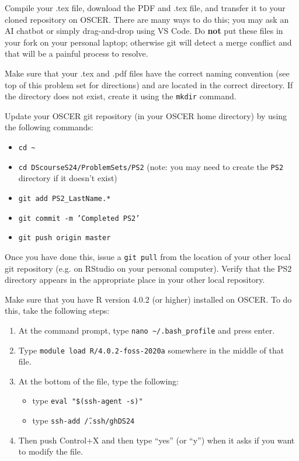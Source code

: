 \documentclass[12pt,english]{exam}
\begin{document}
\begin{questions}
\question Compile your .tex file, download the PDF and .tex file, and transfer it to your cloned repository on OSCER. There are many ways to do this;  you may ask an AI chatbot or simply drag-and-drop using VS Code. Do \textbf{not} put these files in your fork on your personal laptop; otherwise git will detect a merge conflict and that will be a painful process to resolve.

\question Make sure that your .tex and .pdf files have the correct naming convention (see top of this problem set for directions) and are located in the correct directory. If the directory does not exist, create it using the \texttt{mkdir} command.

\question Update your OSCER git repository (in your OSCER home directory) by using the following commands:
\begin{itemize}
    \item \texttt{cd \~}
    \item \texttt{cd DScourseS24/ProblemSets/PS2} (note: you may need to create the \texttt{PS2} directory if it doesn't exist)
    \item \texttt{git add PS2\_LastName.*}
    \item \texttt{git commit -m 'Completed PS2'}
    \item \texttt{git push origin master}
\end{itemize}
Once you have done this, issue a \texttt{git pull} from the location of your other local git repository (e.g. on RStudio on your personal computer). Verify that the PS2 directory appears in the appropriate place in your other local repository.

\question Make sure that you have R version 4.0.2 (or higher) installed on OSCER. To do this, take the following steps:
\begin{enumerate}
    \item At the command prompt, type \texttt{nano \textasciitilde/.bash\_profile} and press enter. 
    \item Type \texttt{module load R/4.0.2-foss-2020a} somewhere in the middle of that file. 
    \item At the bottom of the file, type the following:
        \begin{itemize}
        \item type \texttt{eval "\$(ssh-agent -s)"}
        \item type \texttt{ssh-add \~/.ssh/ghDS24}
        \end{itemize}
    \item Then push Control+X and then type ``yes'' (or ``y'') when it asks if you want to modify the file.
\end{enumerate}


\end{questions}
\end{document}
